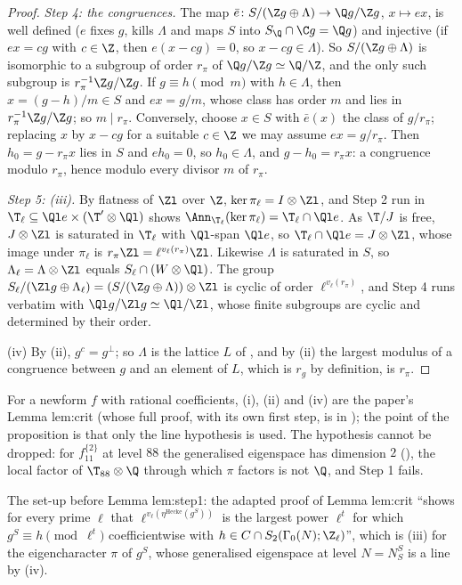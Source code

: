 \begin{proof}
\emph{Step 4: the congruences.} The map $\bar e\colon S/(\Z g\oplus\Lambda)\to\Q g/\Z g$, $x\mapsto ex$, is well defined ($e$ fixes $g$, kills $\Lambda$ and maps $S$ into $S_\Q\cap\C g=\Q g$) and
injective (if $ex=cg$ with $c\in\Z$, then $e(x-cg)=0$, so $x-cg\in\Lambda$). So $S/(\Z g\oplus\Lambda)$ is isomorphic to a subgroup of order $r_\pi$ of $\Q g/\Z g\simeq\Q/\Z$, and the only such
subgroup is $r_\pi^{-1}\Z g/\Z g$. If $g\equiv h\pmod m$ with $h\in\Lambda$, then $x=(g-h)/m\in S$ and $ex=g/m$, whose class has order $m$ and lies in $r_\pi^{-1}\Z g/\Z g$; so $m\mid r_\pi$.
Conversely, choose $x\in S$ with $\bar e(x)$ the class of $g/r_\pi$; replacing $x$ by $x-cg$ for a suitable $c\in\Z$ we may assume $ex=g/r_\pi$. Then $h_0=g-r_\pi x$ lies in $S$ and $eh_0=0$,
so $h_0\in\Lambda$, and $g-h_0=r_\pi x$: a congruence modulo $r_\pi$, hence modulo every divisor $m$ of $r_\pi$.

\emph{Step 5: (iii).} By flatness of $\Zl$ over $\Z$, $\ker\pi_\ell=I\otimes\Zl$, and Step 2 run in $\T_\ell\subseteq\Ql e\times(\T'\otimes\Ql)$ shows $\Ann_{\T_\ell}(\ker\pi_\ell)=\T_\ell\cap\Ql e$. As $\T/J$ is
free, $J\otimes\Zl$ is saturated in $\T_\ell$ with $\Ql$-span $\Ql e$, so $\T_\ell\cap\Ql e=J\otimes\Zl$, whose image under $\pi_\ell$ is $r_\pi\Zl=\ell^{v_\ell(r_\pi)}\Zl$. Likewise $\Lambda$ is saturated in $S$, so
$\Lambda_\ell=\Lambda\otimes\Zl$ equals $S_\ell\cap(W\otimes\Ql)$. The group $S_\ell/(\Zl g\oplus\Lambda_\ell)=(S/(\Z g\oplus\Lambda))\otimes\Zl$ is cyclic of order $\ell^{v_\ell(r_\pi)}$, and Step 4 runs verbatim
with $\Ql g/\Zl g\simeq\Ql/\Zl$, whose finite subgroups are cyclic and determined by their order.

(iv) By (ii), $g^c=g^\perp$; so $\Lambda$ is the lattice $L$ of , and by (ii) the largest modulus of a congruence between $g$ and an
element of $L$, which is $r_g$ by definition, is $r_\pi$.
\end{proof}

For a newform $f$ with rational coefficients, (i), (ii) and (iv) are the paper's Lemma lem:crit (whose full proof, with its own first step, is in ); the point of
the proposition is that only the line hypothesis is used. The hypothesis cannot be dropped: for $f_{11}^{\{2\}}$ at level $88$ the generalised eigenspace has dimension $2$
(), the local factor of $\T_{88}\otimes\Q$ through which $\pi$ factors is not $\Q$, and Step 1 fails.

\begin{paperlink}\label{pl:hecke:congruence-module}
The set-up before Lemma lem:step1: the adapted proof of Lemma lem:crit ``shows for every prime $\ell$ that
$\ell^{v_\ell(\eta^{\mathrm{Hecke}}(g^S))}$ is the largest power $\ell^t$ for which $g^S\equiv h\pmod{\ell^t}$ coefficientwise with $h\in C\cap S_2(\Gamma_0(N);\Z_\ell)$'', which is (iii) for the eigencharacter $\pi$ of $g^S$, whose generalised eigenspace at level $N=N_S^S$ is a line by (iv).
\end{paperlink}

